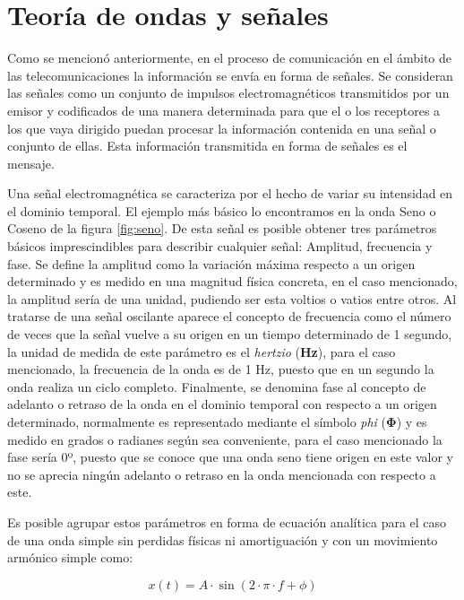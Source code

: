 \section{Teoría de ondas y señales}
\par Como se mencionó anteriormente, en el proceso de comunicación en el ámbito de las telecomunicaciones la información se envía en forma de señales. Se consideran las señales como un conjunto de impulsos electromagnéticos transmitidos por un emisor y codificados de una manera determinada para que el o los receptores a los que vaya dirigido puedan procesar la información contenida en una señal o conjunto de ellas. Esta información transmitida en forma de señales es el mensaje.
\\
\par Una señal electromagnética se caracteriza por el hecho de variar su intensidad en el dominio temporal. El ejemplo más básico lo encontramos en la onda Seno o Coseno de la figura
\ref{fig:seno}. De esta señal es posible obtener tres parámetros básicos imprescindibles para describir cualquier señal: Amplitud, frecuencia y fase. Se define la amplitud como la variación máxima respecto a un origen determinado y es medido en una magnitud física concreta, en el caso mencionado, la amplitud sería de una unidad, pudiendo ser esta voltios o vatios entre otros. Al tratarse de una señal oscilante aparece el concepto de frecuencia como el número de veces que la señal vuelve a su origen en un tiempo determinado de 1 segundo, la unidad de medida de este parámetro es el \textit{hertzio} (\textbf{Hz}), para el caso mencionado, la frecuencia de la onda es de 1 Hz, puesto que en un segundo la onda realiza un ciclo completo. Finalmente, se denomina fase al concepto de adelanto o retraso de la onda en el dominio temporal con respecto a un origen determinado, normalmente es representado mediante el símbolo \textit{phi} (\textbf{Φ}) y es medido en grados o radianes según sea conveniente, para el caso mencionado la fase sería 0º, puesto que se conoce que una onda seno tiene origen en este valor y no se aprecia ningún adelanto o retraso en la onda mencionada con respecto a este. 
\\
\par Es posible agrupar estos parámetros en forma de ecuación analítica para el caso de una onda simple sin perdidas físicas ni amortiguación y con un movimiento armónico simple como:

\begin{equation}
	x(t)=A\cdot \sin(2\cdot\pi\cdot f+\phi )
	\label{eq: seno}
\end{equation}

